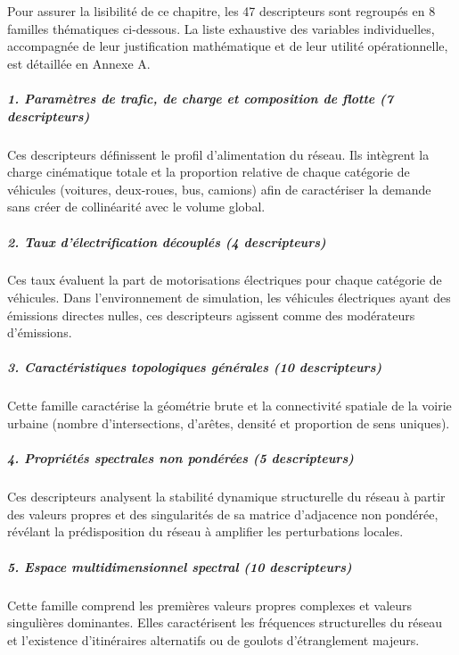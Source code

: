 \documentclass[10pt, a4paper]{article}
\begin{document}
Pour assurer la lisibilité de ce chapitre, les 47 descripteurs sont
regroupés en 8 familles thématiques ci-dessous. La liste exhaustive des
variables individuelles, accompagnée de leur justification mathématique
et de leur utilité opérationnelle, est détaillée en Annexe A.

\subparagraph{1. Paramètres de trafic, de charge et composition de
flotte (7
descripteurs)}\label{paramuxe8tres-de-trafic-de-charge-et-composition-de-flotte-7-descripteurs}

Ces descripteurs définissent le profil d'alimentation du réseau. Ils
intègrent la charge cinématique totale et la proportion relative de
chaque catégorie de véhicules (voitures, deux-roues, bus, camions) afin
de caractériser la demande sans créer de collinéarité avec le volume
global.

\subparagraph{2. Taux d'électrification découplés (4
descripteurs)}\label{taux-duxe9lectrification-duxe9coupluxe9s-4-descripteurs}

Ces taux évaluent la part de motorisations électriques pour chaque
catégorie de véhicules. Dans l'environnement de simulation, les
véhicules électriques ayant des émissions directes nulles, ces
descripteurs agissent comme des modérateurs d'émissions.

\subparagraph{3. Caractéristiques topologiques générales (10
descripteurs)}\label{caractuxe9ristiques-topologiques-guxe9nuxe9rales-10-descripteurs}

Cette famille caractérise la géométrie brute et la connectivité spatiale
de la voirie urbaine (nombre d'intersections, d'arêtes, densité et
proportion de sens uniques).

\subparagraph{4. Propriétés spectrales non pondérées (5
descripteurs)}\label{propriuxe9tuxe9s-spectrales-non-ponduxe9ruxe9es-5-descripteurs}

Ces descripteurs analysent la stabilité dynamique structurelle du réseau
à partir des valeurs propres et des singularités de sa matrice
d'adjacence non pondérée, révélant la prédisposition du réseau à
amplifier les perturbations locales.

\subparagraph{5. Espace multidimensionnel spectral (10
descripteurs)}\label{espace-multidimensionnel-spectral-10-descripteurs}

Cette famille comprend les premières valeurs propres complexes et
valeurs singulières dominantes. Elles caractérisent les fréquences
structurelles du réseau et l'existence d'itinéraires alternatifs ou de
goulots d'étranglement majeurs.
\end{document}
